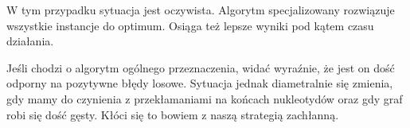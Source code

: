 \documentclass[a4paper]{article}
\begin{document}
W tym przypadku sytuacja jest oczywista. Algorytm specjalizowany rozwiązuje wszystkie instancje do optimum. Osiąga też
lepsze wyniki pod kątem czasu działania.


Jeśli chodzi o algorytm ogólnego przeznaczenia, widać wyraźnie, że jest on dość odporny na pozytywne błędy losowe.
Sytuacja jednak diametralnie się zmienia, gdy mamy do czynienia z przekłamaniami na końcach nukleotydów oraz gdy graf
robi się dość gęsty. Kłóci się to bowiem z naszą strategią zachłanną.
\end{document}
